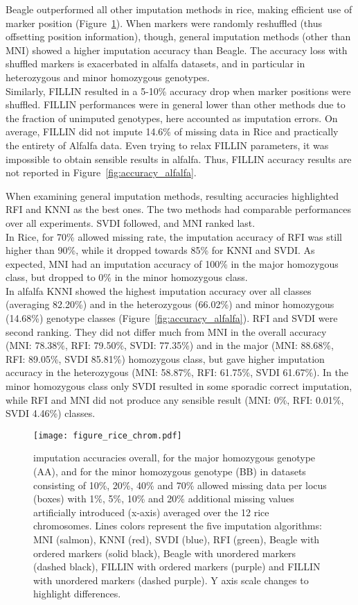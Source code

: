 Beagle outperformed all other imputation methods in rice, making efficient use of marker position (Figure~\ref{fig:accuracy_rice}). When markers were randomly reshuffled (thus offsetting position information), though, general imputation methods (other than MNI) showed a higher imputation accuracy than Beagle. The accuracy loss with shuffled markers is exacerbated in alfalfa datasets, and in particular in heterozygous and minor homozygous genotypes.\\
Similarly, FILLIN resulted in a 5-10\% accuracy drop when marker positions were shuffled. FILLIN performances were in general lower than other methods due to the fraction of unimputed genotypes, here accounted as imputation errors. On average, FILLIN did not impute 14.6\% of missing data in Rice and practically the entirety of Alfalfa data. Even trying to relax FILLIN parameters, it was impossible to obtain sensible results in alfalfa. Thus, FILLIN accuracy results are not reported in Figure~\ref{fig:accuracy_alfalfa}.

When examining general imputation methods, resulting accuracies highlighted RFI and KNNI as the best ones. The two methods had comparable performances over all experiments. SVDI followed, and MNI ranked last.\\
In Rice, for 70\% allowed missing rate, the imputation accuracy of RFI was still higher than 90\%, while it dropped towards 85\% for KNNI and SVDI. As expected, MNI had an imputation accuracy of 100\% in the major homozygous class, but dropped to 0\% in the minor homozygous class.\\
In alfalfa KNNI showed the highest imputation accuracy over all classes (averaging 82.20\%) and in the heterozygous (66.02\%) and minor homozygous (14.68\%) genotype classes (Figure~\ref{fig:accuracy_alfalfa}). RFI and SVDI were second ranking. They did not differ much from MNI in the overall accuracy (MNI: 78.38\%, RFI: 79.50\%, SVDI: 77.35\%) and in the major (MNI: 88.68\%, RFI: 89.05\%, SVDI 85.81\%) homozygous class, but gave higher imputation accuracy in the heterozygous (MNI: 58.87\%, RFI: 61.75\%, SVDI 61.67\%). In the minor homozygous class only SVDI resulted in some sporadic correct imputation, while RFI and MNI did not produce any sensible result (MNI: 0\%, RFI: 0.01\%, SVDI 4.46\%) classes. 

\begin{figure}
\texttt{[image: figure\_rice\_chrom.pdf]}
\caption[Rice imputation accuracies]{
imputation accuracies overall, for the major homozygous genotype (AA), and for the minor homozygous genotype (BB) in datasets consisting of 10\%, 20\%, 40\% and 70\% allowed missing data per locus (boxes) with 1\%, 5\%, 10\% and 20\% additional missing values artificially introduced (x-axis) averaged over the 12 rice chromosomes. Lines colors represent the five imputation algorithms: MNI (salmon), KNNI (red), SVDI (blue), RFI (green), Beagle with ordered markers (solid black), Beagle with unordered markers (dashed black), FILLIN with ordered markers (purple) and FILLIN with unordered markers (dashed purple). Y axis scale changes to highlight differences.}
\label{fig:accuracy_rice}
\end{figure}

